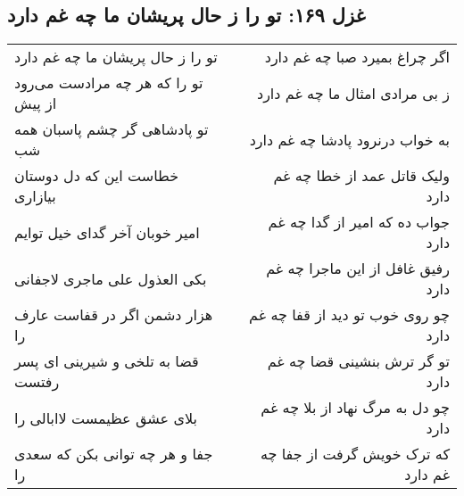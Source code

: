 \begin{center}
\section*{غزل ۱۶۹: تو را ز حال پریشان ما چه غم دارد}
\label{sec:169}
\begin{longtable}{l p{0.5cm} r}
تو را ز حال پریشان ما چه غم دارد
&&
اگر چراغ بمیرد صبا چه غم دارد
\\
تو را که هر چه مرادست می‌رود از پیش
&&
ز بی مرادی امثال ما چه غم دارد
\\
تو پادشاهی گر چشم پاسبان همه شب
&&
به خواب درنرود پادشا چه غم دارد
\\
خطاست این که دل دوستان بیازاری
&&
ولیک قاتل عمد از خطا چه غم دارد
\\
امیر خوبان آخر گدای خیل توایم
&&
جواب ده که امیر از گدا چه غم دارد
\\
بکی العذول علی ماجری لاجفانی
&&
رفیق غافل از این ماجرا چه غم دارد
\\
هزار دشمن اگر در قفاست عارف را
&&
چو روی خوب تو دید از قفا چه غم دارد
\\
قضا به تلخی و شیرینی ای پسر رفتست
&&
تو گر ترش بنشینی قضا چه غم دارد
\\
بلای عشق عظیمست لاابالی را
&&
چو دل به مرگ نهاد از بلا چه غم دارد
\\
جفا و هر چه توانی بکن که سعدی را
&&
که ترک خویش گرفت از جفا چه غم دارد
\\
\end{longtable}
\end{center}
